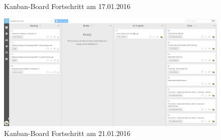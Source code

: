\begin{landscape}
\begin{figure}[H]
  \caption[Kanban-Board 17.01.2016]{Kanban-Board Fortschritt am 17.01.2016}
\end{figure}
\begin{figure}[H]
  \centering
  \includegraphics[scale=0.38]{98_Bilder/98_Anhang/20160121_Kanban_board}
  \caption[Kanban-Board 21.01.2016]{Kanban-Board Fortschritt am 21.01.2016}
\end{figure}
\end{landscape}
